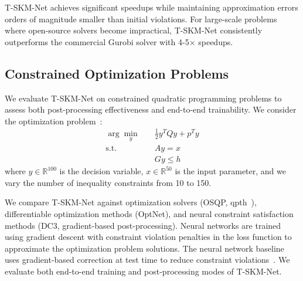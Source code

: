 \documentclass[letterpaper]{article} %
\begin{document}
T-SKM-Net achieves significant speedups while maintaining approximation errors orders of magnitude smaller than initial violations. For large-scale problems where open-source solvers become impractical, T-SKM-Net consistently outperforms the commercial Gurobi solver with 4-5$\times$ speedups.

\subsection{Constrained Optimization Problems}

We evaluate T-SKM-Net on constrained quadratic programming problems to assess both post-processing effectiveness and end-to-end trainability. We consider the optimization problem~\cite{nocedal2006numerical}:
\begin{align}
\arg\min_y \quad & \frac{1}{2} y^T Q y + p^T y \\
\text{s.t.} \quad & Ay = x \\
& Gy \leq h
\end{align}
where $y \in \mathbb{R}^{100}$ is the decision variable, $x \in \mathbb{R}^{50}$ is the input parameter, and we vary the number of inequality constraints from 10 to 150.

We compare T-SKM-Net against optimization solvers (OSQP, qpth~\cite{amosOptNetDifferentiableOptimization2017}), differentiable optimization methods (OptNet), and neural constraint satisfaction methods (DC3, gradient-based post-processing). Neural networks are trained using gradient descent with constraint violation penalties in the loss function to approximate the optimization problem solutions. The neural network baseline uses gradient-based correction at test time to reduce constraint violations~\cite{dontiDC3LearningMethod2021}. We evaluate both end-to-end training and post-processing modes of T-SKM-Net.
\end{document}
